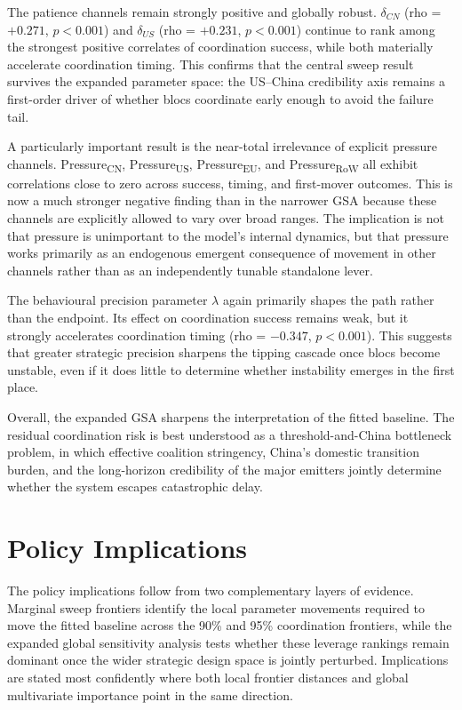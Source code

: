 \documentclass[12pt,a4paper]{article}
\begin{document}
The patience channels remain strongly positive and globally robust. $\delta_{CN}$ (rho = $+0.271$, $p < 0.001$) and $\delta_{US}$ (rho = $+0.231$, $p < 0.001$) continue to rank among the strongest positive correlates of coordination success, while both materially accelerate coordination timing. This confirms that the central sweep result survives the expanded parameter space: the US--China credibility axis remains a first-order driver of whether blocs coordinate early enough to avoid the failure tail.

A particularly important result is the near-total irrelevance of explicit pressure channels. Pressure\textsubscript{CN}, Pressure\textsubscript{US}, Pressure\textsubscript{EU}, and Pressure\textsubscript{RoW} all exhibit correlations close to zero across success, timing, and first-mover outcomes. This is now a much stronger negative finding than in the narrower GSA because these channels are explicitly allowed to vary over broad ranges. The implication is not that pressure is unimportant to the model's internal dynamics, but that pressure works primarily as an endogenous emergent consequence of movement in other channels rather than as an independently tunable standalone lever.

The behavioural precision parameter $\lambda$ again primarily shapes the path rather than the endpoint. Its effect on coordination success remains weak, but it strongly accelerates coordination timing (rho = $-0.347$, $p < 0.001$). This suggests that greater strategic precision sharpens the tipping cascade once blocs become unstable, even if it does little to determine whether instability emerges in the first place.

Overall, the expanded GSA sharpens the interpretation of the fitted baseline. The residual coordination risk is best understood as a threshold-and-China bottleneck problem, in which effective coalition stringency, China's domestic transition burden, and the long-horizon credibility of the major emitters jointly determine whether the system escapes catastrophic delay.

\section{Policy Implications}

The policy implications follow from two complementary layers of evidence. Marginal sweep frontiers identify the local parameter movements required to move the fitted baseline across the 90\% and 95\% coordination frontiers, while the expanded global sensitivity analysis tests whether these leverage rankings remain dominant once the wider strategic design space is jointly perturbed. Implications are stated most confidently where both local frontier distances and global multivariate importance point in the same direction.
\end{document}
